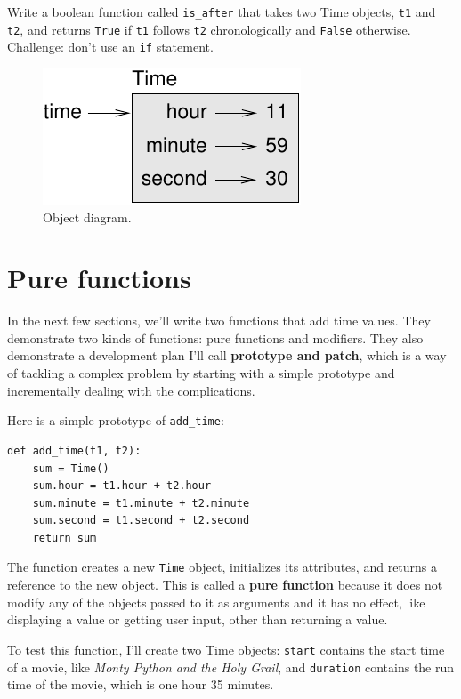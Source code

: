 \documentclass[10pt]{book}
\begin{document}
\begin{CJK}{UTF8}{gbsn}
\begin{exercise}
Write a boolean function called \verb"is_after" that
takes two Time objects, {\tt t1} and {\tt t2}, and
returns {\tt True} if {\tt t1} follows {\tt t2} chronologically and
{\tt False} otherwise.  Challenge: don't use an {\tt if} statement.
\end{exercise}

\begin{figure}
\centerline
{\includegraphics[scale=0.8]{figs/time.pdf}}
\caption{Object diagram.}
\label{fig.time}
\end{figure}


\section{Pure functions}

In the next few sections, we'll write two functions that add time
values.  They demonstrate two kinds of functions: pure functions and
modifiers.  They also demonstrate a development plan I'll call {\bf
  prototype and patch}, which is a way of tackling a complex problem
by starting with a simple prototype and incrementally dealing with the
complications.

Here is a simple prototype of \verb"add_time":

\begin{verbatim}
def add_time(t1, t2):
    sum = Time()
    sum.hour = t1.hour + t2.hour
    sum.minute = t1.minute + t2.minute
    sum.second = t1.second + t2.second
    return sum
\end{verbatim}
%
The function creates a new {\tt Time} object, initializes its
attributes, and returns a reference to the new object.  This is called
a {\bf pure function} because it does not modify any of the objects
passed to it as arguments and it has no effect,
like displaying a value or getting user input, 
other than returning a value.

To test this function, I'll create two Time objects: {\tt start}
contains the start time of a movie, like {\em Monty Python and the
Holy Grail}, and {\tt duration} contains the run time of the movie,
which is one hour 35 minutes.


\end{CJK}
\end{document}
